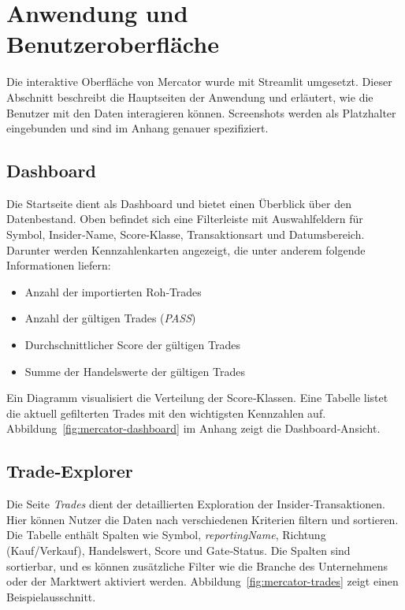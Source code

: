 \section{Anwendung und Benutzeroberfläche}
\label{sec:anwendung}

Die interaktive Oberfläche von Mercator wurde mit Streamlit umgesetzt. Dieser Abschnitt beschreibt die Hauptseiten der Anwendung und erläutert, wie die Benutzer mit den Daten interagieren können. Screenshots werden als Platzhalter eingebunden und sind im Anhang genauer spezifiziert.

\subsection{Dashboard}

Die Startseite dient als Dashboard und bietet einen Überblick über den Datenbestand. Oben befindet sich eine Filterleiste mit Auswahlfeldern für Symbol, Insider‑Name, Score‑Klasse, Transaktionsart und Datumsbereich. Darunter werden Kennzahlenkarten angezeigt, die unter anderem folgende Informationen liefern:

\begin{itemize}
  \item Anzahl der importierten Roh‑Trades
  \item Anzahl der gültigen Trades (\emph{PASS})
  \item Durchschnittlicher Score der gültigen Trades
  \item Summe der Handelswerte der gültigen Trades
\end{itemize}

Ein Diagramm visualisiert die Verteilung der Score‑Klassen. Eine Tabelle listet die aktuell gefilterten Trades mit den wichtigsten Kennzahlen auf. Abbildung~\ref{fig:mercator-dashboard} im Anhang zeigt die Dashboard‑Ansicht.

\subsection{Trade‑Explorer}

Die Seite \emph{Trades} dient der detaillierten Exploration der Insider‑Transaktionen. Hier können Nutzer die Daten nach verschiedenen Kriterien filtern und sortieren. Die Tabelle enthält Spalten wie Symbol, \emph{reportingName}, Richtung (Kauf/Verkauf), Handelswert, Score und Gate‑Status. Die Spalten sind sortierbar, und es können zusätzliche Filter wie die Branche des Unternehmens oder der Marktwert aktiviert werden. Abbildung~\ref{fig:mercator-trades} zeigt einen Beispielausschnitt.

